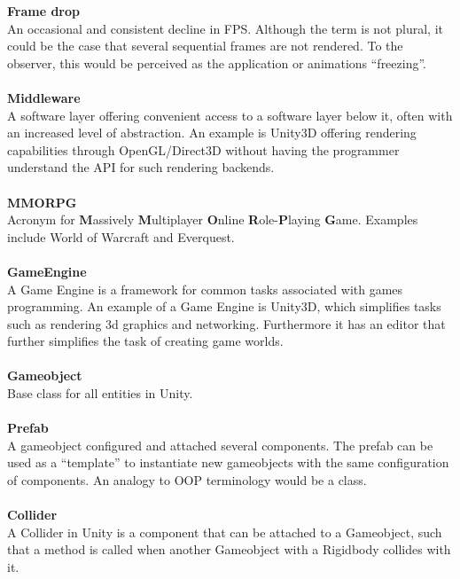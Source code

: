 \textbf{Frame drop}\vspace{4pt}\\
An occasional and consistent decline in FPS. Although the term is not plural, it could be the case that several sequential frames are not rendered.
To the observer, this would be perceived as the application or animations ``freezing''.\\
\\
\textbf{Middleware}\vspace{4pt}\\
A software layer offering convenient access to a software layer below it, often with an increased level of abstraction.
An example is Unity3D offering rendering capabilities through OpenGL/Direct3D without having the programmer understand the API for such rendering backends.\\
\\
\textbf{MMORPG}\vspace{4pt}\\
Acronym for \textbf{M}assively \textbf{M}ultiplayer \textbf{O}nline \textbf{R}ole-\textbf{P}laying \textbf{G}ame.
Examples include World of Warcraft and Everquest.\\
\\
\textbf{GameEngine}\vspace{4pt}\\
A Game Engine is a framework for common tasks associated with games programming.
An example of a Game Engine is Unity3D, which simplifies tasks such as rendering 3d graphics and networking.
Furthermore it has an editor that further simplifies the task of creating game worlds\cite{unityGameEngine}.\\
\\
\textbf{Gameobject}\vspace{4pt}\\
Base class for all entities in Unity.\cite{prefaceGameobject}\\
\\
\textbf{Prefab}\vspace{4pt}\\
A gameobject configured and attached several components. The prefab can be used as a ``template'' to instantiate new gameobjects with the same configuration of components.
An analogy to OOP terminology would be a class.\\
\\
\textbf{Collider}\vspace{4pt}\\
A Collider in Unity is a component that can be attached to a Gameobject, such that a method is called when another Gameobject with a Rigidbody\cite{rigidbody} collides with it.\cite{collider2d}
